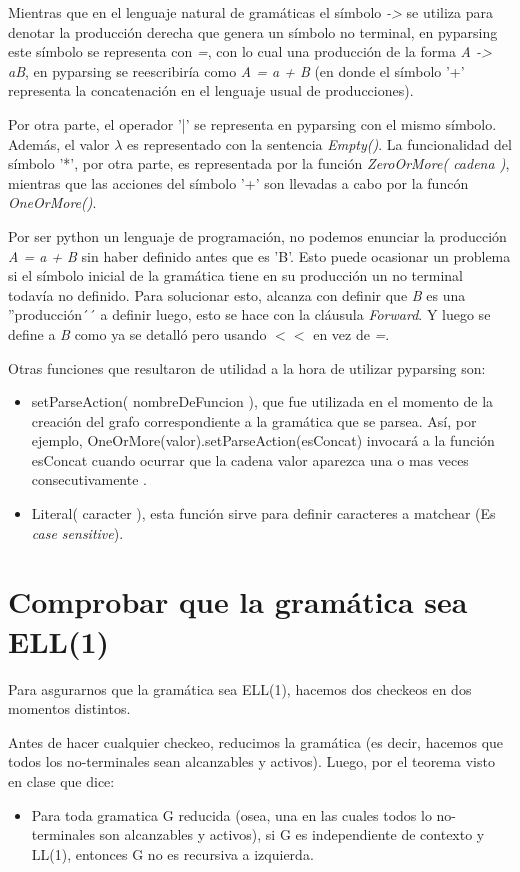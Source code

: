 \documentclass[a4paper]{report}
\begin{document}
Mientras que en el lenguaje natural de gramáticas el símbolo \emph{->} se utiliza para denotar la producción derecha que genera un símbolo no terminal, en pyparsing este símbolo se representa con \emph{=}, con lo cual una producción de la forma \emph{A -> aB}, en pyparsing se reescribiría como \emph{A = a + B} (en donde el símbolo '+' representa la concatenación en el lenguaje usual de producciones). 

Por otra parte, el operador '|' se representa en pyparsing con el mismo símbolo. Además, el valor $\lambda$ es representado con la sentencia \emph{Empty()}. La funcionalidad del símbolo '*', por otra parte, es representada por la función \emph{ZeroOrMore( cadena )}, mientras que las acciones del símbolo '+' son llevadas a cabo por la funcón \emph{OneOrMore()}. 

Por ser python un lenguaje de programación, no podemos enunciar la producción \emph{A = a + B} sin haber definido antes que es 'B'. Esto puede ocasionar un problema si el símbolo inicial de la gramática tiene en su producción un no terminal todavía no definido. Para solucionar esto, alcanza con definir que \emph{B} es una ''producción´´ a definir luego, esto se hace con la cláusula \emph{Forward}. Y luego se define a \emph{B} como ya se detalló pero usando $<<$ en vez de \emph{=}.

Otras funciones que resultaron de utilidad a la hora de utilizar pyparsing son:

\begin{itemize}
	\item setParseAction( nombreDeFuncion ), que fue utilizada en el momento de la creación del grafo correspondiente a la gramática que se parsea. Así, por ejemplo, OneOrMore(valor).setParseAction(esConcat) invocará a la función esConcat cuando ocurrar que la cadena valor aparezca una o mas veces consecutivamente .
	\item Literal( caracter ), esta función sirve para definir caracteres a matchear (Es \emph{case sensitive}). 
\end{itemize}

\section*{Comprobar que la gramática sea ELL(1)}

Para asgurarnos que la gramática sea ELL(1), hacemos dos checkeos en dos
momentos distintos.


Antes de hacer cualquier checkeo, reducimos la gramática (es
decir, hacemos que todos los no-terminales sean alcanzables y activos). Luego,
por el teorema visto en clase que dice:
\begin{itemize}
\item Para toda gramatica G reducida (osea, una en las cuales todos lo
	no-terminales son alcanzables y activos), si G es independiente de contexto
	y LL(1), entonces G no es recursiva a izquierda.
\end{itemize}
\end{document}
